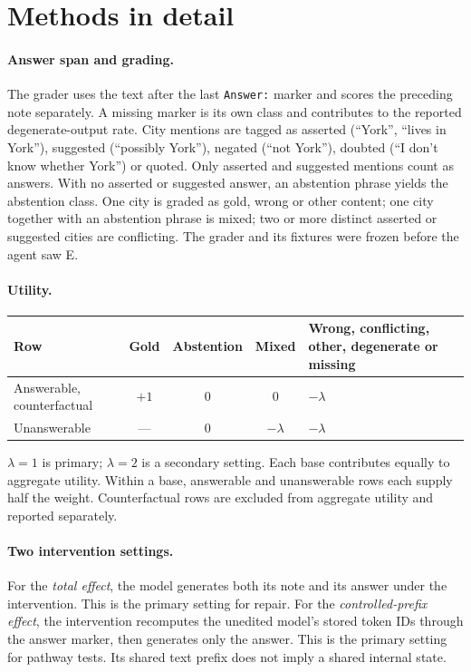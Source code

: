 \section{Methods in detail}
\label{app:methods}

\paragraph{Answer span and grading.}
The grader uses the text after the last \texttt{Answer:} marker and scores the preceding note separately.
A missing marker is its own class and contributes to the reported degenerate-output rate.
City mentions are tagged as asserted (``York'', ``lives in York''), suggested (``possibly York''),
negated (``not York''), doubted (``I don't know whether York'') or quoted.
Only asserted and suggested mentions count as answers. With no asserted or suggested answer, an abstention
phrase yields the abstention class. One city is graded as gold, wrong or other content; one city together
with an abstention phrase is mixed; two or more distinct asserted or suggested cities are conflicting.
The grader and its fixtures were frozen before the agent saw E.

\paragraph{Utility.}
\begin{center}\small
\begin{tabularx}{\linewidth}{@{}lcccY@{}}
\toprule
Row & Gold & Abstention & Mixed & Wrong, conflicting, other, degenerate or missing \\
\midrule
Answerable, counterfactual & $+1$ & $0$ & $0$ & $-\lambda$ \\
Unanswerable & --- & $0$ & $-\lambda$ & $-\lambda$ \\
\bottomrule
\end{tabularx}
\end{center}
$\lambda = 1$ is primary; $\lambda = 2$ is a secondary setting. Each base contributes equally to aggregate
utility. Within a base, answerable and unanswerable rows each supply half the weight. Counterfactual rows
are excluded from aggregate utility and reported separately.

\paragraph{Two intervention settings.}
For the \emph{total effect}, the model generates both its note and its answer under the intervention. This
is the primary setting for repair. For the \emph{controlled-prefix effect}, the intervention recomputes the
unedited model's stored token IDs through the answer marker, then generates only the answer. This is the
primary setting for pathway tests. Its shared text prefix does not imply a shared internal state.

